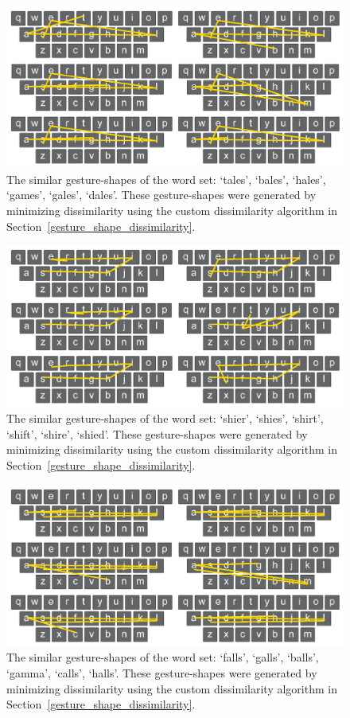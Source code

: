 \begin{figure}[t]
	\centering
	\includegraphics[width=5in]{Figures/fig_words_8}
	\caption[Word Set 8]{The similar gesture-shapes of the word set: `tales', `bales', `hales', `games', `gales', `dales'. These gesture-shapes were generated by minimizing dissimilarity using the custom dissimilarity algorithm in Section~\ref{gesture_shape_dissimilarity}.}
	\label{fig_words_8}
\end{figure}

\begin{figure}[b]
	\centering
	\includegraphics[width=5in]{Figures/fig_words_9}
	\caption[Word Set 9]{The similar gesture-shapes of the word set: `shier', `shies', `shirt', `shift', `shire', `shied'. These gesture-shapes were generated by minimizing dissimilarity using the custom dissimilarity algorithm in Section~\ref{gesture_shape_dissimilarity}.}
	\label{fig_words_9}
\end{figure}

\clearpage

\begin{figure}[t]
	\centering
	\includegraphics[width=5in]{Figures/fig_words_10}
	\caption[Word Set 10]{The similar gesture-shapes of the word set: `falls', `galls', `balls', `gamma', `calls', `halls'. These gesture-shapes were generated by minimizing dissimilarity using the custom dissimilarity algorithm in Section~\ref{gesture_shape_dissimilarity}.}
	\label{fig_words_10}
\end{figure}

